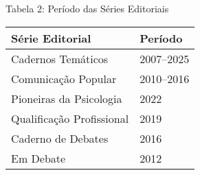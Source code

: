 \documentclass{beamer}
\begin{document}
\begin{frame}{Tabela 2: Período das Séries Editoriais}
    \begin{tabular}{l l}
        \toprule
        \textbf{Série Editorial} & \textbf{Período} \\
        \midrule
        Cadernos Temáticos & 2007–2025 \\
        Comunicação Popular & 2010–2016 \\
        Pioneiras da Psicologia & 2022 \\
        Qualificação Profissional & 2019 \\
        Caderno de Debates & 2016 \\
        Em Debate & 2012 \\
        \bottomrule
    \end{tabular}
\end{frame}
\end{document}
